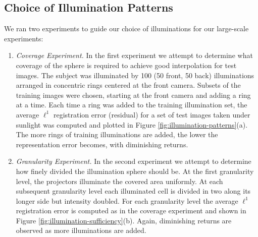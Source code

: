 \documentclass[12pt,journal,draftcls,letterpaper,onecolumn]{IEEEtran}
\begin{document}
\subsection{Choice of Illumination Patterns}

We ran two experiments to guide our choice of illuminations for
our large-scale experiments:
\begin{enumerate}
\item {\em Coverage Experiment.} In the first experiment we
    attempt to determine what coverage of the sphere is
    required to achieve good interpolation for test images.
    The subject was illuminated by 100 (50 front, 50 back)
    illuminations arranged in concentric rings centered at
    the front camera.  Subsets of the training images were
    chosen, starting at the front camera and adding a ring
    at a time.  Each time a ring was added to the training
    illumination set, the average $\ell^1$ registration
    error (residual) for a set of test images taken under
    sunlight was computed and plotted in Figure
    \ref{fig:illumination-patterns}(a).  The more rings of
    training illuminations are added, the lower the
    representation error becomes, with diminishing returns.
\item {\em Granularity Experiment.} In the second
    experiment we attempt to determine how finely divided
    the illumination sphere should be.  At the first
    granularity level, the projectors  illuminate the
    covered area uniformly.  At each subsequent granularity
    level each illuminated cell is divided in two along its
    longer side but intensity doubled.  For each
    granularity level the average $\ell^1$ registration
    error is computed as in the coverage experiment and
    shown in Figure \ref{fig:illumination-sufficiency}(b).
    Again, diminishing returns are observed as more
    illuminations are added.
\end{enumerate}
\end{document}

